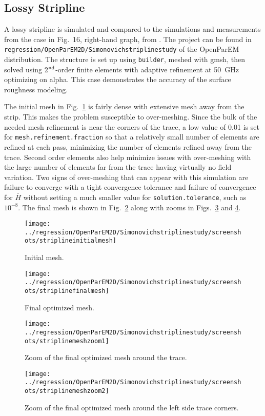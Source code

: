 \documentclass[titlepage]{article}
\renewcommand\_{\textunderscore\linebreak[1]}
\begin{document}
\subsection{Lossy Stripline}

A lossy stripline is simulated and compared to the simulations and measurements from the case in Fig.~16, right-hand graph, from \cite{Simonovich}.  The project can be found in \texttt{regression/OpenParEM2D/Simonovich\_stripline\_study} of the OpenParEM distribution.  The structure is set up using \texttt{builder}, meshed with gmsh, then solved using 2$^{\textnormal{nd}}$-order finite elements with adaptive refinement at 50~GHz optimizing on alpha.  This case demonstrates the accuracy of the surface roughness modeling.

The initial mesh in Fig.~\ref{fig:stripline_initial_mesh} is fairly dense with extensive mesh away from the strip.  This makes the problem susceptible to over-meshing.  Since the bulk of the needed mesh refinement is near the corners of the trace, a low value of 0.01 is set for \texttt{mesh.refinement.fraction} so that a relatively small number of elements are refined at each pass, minimizing the number of elements refined away from the trace. Second order elements also help minimize issues with over-meshing with the large number of elements far from the trace having virtually no field variation.  Two signs of over-meshing that can appear with this simulation are failure to converge with a tight convergence tolerance and failure of convergence for $\overline{H}$ without setting a much smaller value for \texttt{solution.tolerance}, such as $10^{-8}$. The final mesh is shown in Fig.~\ref{fig:stripline_final_mesh} along with zooms in Figs.~\ref{fig:stripline_mesh_zoom1} and \ref{fig:stripline_mesh_zoom2}.

\begin{figure}[H]
  \centering
  \texttt{[image: ../regression/OpenParEM2D/Simonovich\_stripline\_study/screenshots/stripline\_initial\_mesh]}
  \caption{Initial mesh.}
  \label{fig:stripline_initial_mesh}
\end{figure}
\begin{figure}[H]
  \centering
  \texttt{[image: ../regression/OpenParEM2D/Simonovich\_stripline\_study/screenshots/stripline\_final\_mesh]}
  \caption{Final optimized mesh.}
  \label{fig:stripline_final_mesh}
\end{figure}
\begin{figure}[H]
  \centering
  \texttt{[image: ../regression/OpenParEM2D/Simonovich\_stripline\_study/screenshots/stripline\_mesh\_zoom1]}
  \caption{Zoom of the final optimized mesh around the trace.}
  \label{fig:stripline_mesh_zoom1}
\end{figure}
\begin{figure}[H]
  \centering
  \texttt{[image: ../regression/OpenParEM2D/Simonovich\_stripline\_study/screenshots/stripline\_mesh\_zoom2]}
  \caption{Zoom of the final optimized mesh around the left side trace corners.}
  \label{fig:stripline_mesh_zoom2}
\end{figure}
\end{document}
